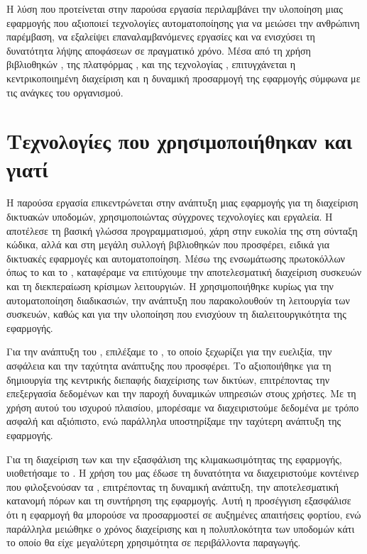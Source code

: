 Η λύση που προτείνεται στην παρούσα εργασία περιλαμβάνει την υλοποίηση μιας εφαρμογής που αξιοποιεί τεχνολογίες αυτοματοποίησης 
για να μειώσει την ανθρώπινη παρέμβαση, να εξαλείψει επαναλαμβανόμενες εργασίες και να ενισχύσει τη δυνατότητα λήψης αποφάσεων σε πραγματικό χρόνο. 
Μέσα από τη χρήση βιβλιοθηκών , της πλατφόρμας , και της τεχνολογίας , επιτυγχάνεται η κεντρικοποιημένη 
διαχείριση και η δυναμική προσαρμογή της εφαρμογής σύμφωνα με τις ανάγκες του οργανισμού.

\section{Τεχνολογίες που χρησιμοποιήθηκαν και γιατί}



Η παρούσα εργασία επικεντρώνεται στην ανάπτυξη μιας εφαρμογής 
για τη διαχείριση δικτυακών υποδομών, χρησιμοποιώντας σύγχρονες 
τεχνολογίες και εργαλεία. Η  αποτέλεσε τη βασική γλώσσα 
προγραμματισμού, χάρη στην ευκολία της στη σύνταξη κώδικα, αλλά και 
στη μεγάλη συλλογή βιβλιοθηκών που προσφέρει, ειδικά για δικτυακές 
εφαρμογές και αυτοματοποίηση. Μέσω της ενσωμάτωσης πρωτοκόλλων όπως 
το  και το , καταφέραμε να επιτύχουμε την 
αποτελεσματική διαχείριση συσκευών και τη διεκπεραίωση κρίσιμων 
λειτουργιών. Η  χρησιμοποιήθηκε κυρίως για την 
αυτοματοποίηση διαδικασιών, την ανάπτυξη  που 
παρακολουθούν τη λειτουργία των συσκευών, καθώς και για την 
υλοποίηση  που ενισχύουν τη διαλειτουργικότητα της εφαρμογής.

Για την ανάπτυξη του , επιλέξαμε το , 
το οποίο ξεχωρίζει για την ευελιξία, την ασφάλεια και την 
ταχύτητα ανάπτυξης που προσφέρει. Το  
αξιοποιήθηκε για τη δημιουργία της κεντρικής διεπαφής διαχείρισης 
των δικτύων, επιτρέποντας την επεξεργασία δεδομένων και 
την παροχή δυναμικών υπηρεσιών στους χρήστες. Με τη χρήση αυτού 
του ισχυρού πλαισίου, μπορέσαμε να διαχειριστούμε δεδομένα με 
τρόπο ασφαλή και αξιόπιστο, ενώ παράλληλα υποστηρίξαμε την ταχύτερη 
ανάπτυξη της εφαρμογής.

Για τη διαχείριση των  και την εξασφάλιση της 
κλιμακωσιμότητας της εφαρμογής, υιοθετήσαμε το . 
Η χρήση του  μας έδωσε τη δυνατότητα να 
διαχειριστούμε κοντέινερ που φιλοξενούσαν τα , 
επιτρέποντας τη δυναμική ανάπτυξη, την αποτελεσματική κατανομή πόρων 
και τη συντήρηση της εφαρμογής. Αυτή η προσέγγιση εξασφάλισε ότι η 
εφαρμογή θα μπορούσε να προσαρμοστεί σε αυξημένες απαιτήσεις φορτίου, 
ενώ παράλληλα μειώθηκε ο χρόνος διαχείρισης και η πολυπλοκότητα των 
υποδομών κάτι το οποίο θα είχε μεγαλύτερη χρησιμότητα σε περιβάλλοντα παραγωγής.

